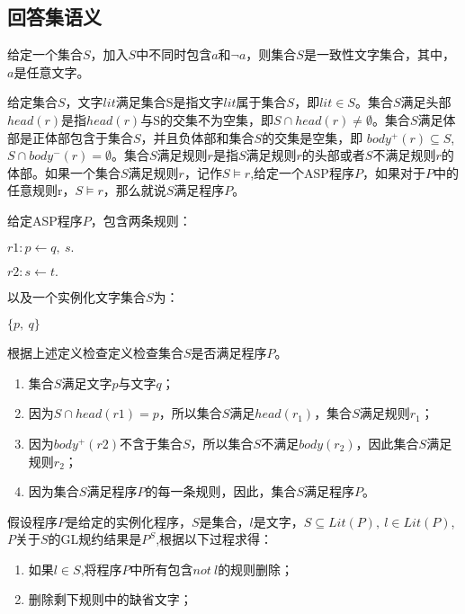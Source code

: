 \subsection{回答集语义}
\begin{definition}[一致性文字集合]给定一个集合$S$，加入$S$中不同时包含$a$和$\neg a$，则集合$S$是一致性文字集合，其中，$a$是任意文字。
\end{definition}


\begin{definition}给定集合$S$，文字$lit$满足集合S是指文字$lit$属于集合$S$，即$lit \in S$。集合$S$满足头部$head(r)$是指$head(r)$与S的交集不为空集，即$S \cap head(r) \neq \emptyset$。集合$S$满足体部是正体部包含于集合$S$，并且负体部和集合$S$的交集是空集，即 $body^+(r) \subseteq S$,$S \cap body^-(r) = \emptyset$。集合$S$满足规则$r$是指$S$满足规则$r$的头部或者$S$不满足规则$r$的体部。如果一个集合$S$满足规则$r$，记作$S \models r$,给定一个ASP程序$P$，如果对于$P$中的任意规则r，$S\models r$，那么就说$S$满足程序$P$。
\end{definition}
\begin{example}
给定ASP程序$P$，包含两条规则：

$r1: p \leftarrow q,\ s. $

$r2:s \leftarrow t.$

以及一个实例化文字集合$S$为：

$\{ p, \ q \}$

根据上述定义检查定义检查集合$S$是否满足程序$P$。
\begin{enumerate}[label=(\arabic*),topsep=0pt]
    \setlength\itemsep{-0.3em}
    \item 集合$S$满足文字$p$与文字$q$；
    \item 因为$S \cap head(r1) = p$，所以集合$S$满足$head(r_1)$，集合$S$满足规则$r_1$；
    \item 因为$ body^+(r2)$不含于集合$S$，所以集合$S$不满足$body(r_2)$，因此集合$S$满足规则$r_2$；
    \item 因为集合$S$满足程序$P$的每一条规则，因此，集合$S$满足程序$P$。
\end{enumerate}
\end{example}
\begin{definition}假设程序$P$是给定的实例化程序，$S$是集合，$l$是文字，$S \subseteq Lit(P), \ l \in Lit(P)$,$P$关于$S$的GL规约结果是$P^S$,根据以下过程求得：
    \begin{enumerate}[label=(\arabic*),topsep=0pt]
        \setlength\itemsep{-0.3em}
        \item 如果$l \in S$,将程序$P$中所有包含$not \ l$的规则删除；
        \item 删除剩下规则中的缺省文字；
    \end{enumerate}
\end{definition}
